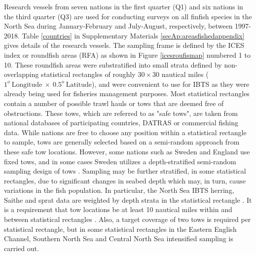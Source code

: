 \documentclass[a4paper 12pt]{article}
\numberwithin{equation}{section}
\begin{document}
Research vessels from seven nations in the first quarter (Q1) and six nations in the third quarter (Q3) are used for conducting surveys on all finfish species in the North Sea during January-February and July-August, respectively, between 1997-2018. Table \ref{countries} in Supplementary Materials \ref{secAp:areasfishedappendix} gives details of the research vessels. The sampling frame is defined by the ICES index or roundfish areas (RFA) as shown in Figure \ref{icesroufismap} numbered 1 to 10. These  roundfish areas were substratified into small strata defined by non-overlapping statistical rectangles of roughly $30 \times 30$ nautical miles ($1^{o} \  \mathrm{Longitude} \ \times  \  0.5^{o} \ \mathrm{Latitude}$), and were convenient to use for IBTS as they were already being used for fisheries management purposes. Most statistical rectangles contain a number of possible trawl hauls or tows that are deemed free of obstructions. These tows, which are referred to as   "safe tows", are taken from national databases of participating countries, DATRAS \citep{datras} or commercial fishing data. While nations are free to choose any position within a statistical rectangle to sample, tows are generally selected based on a semi-random approach from these safe tow locations. However, some nations such as Sweden and England use fixed tows, and in some cases Sweden utilizes a depth-stratified semi-random sampling design of tows \citep{ICES2018}. Sampling may be further stratified, in some statistical rectangles, due to significant changes in seabed depth which may, in turn, cause variations in the fish population. In particular, the North Sea IBTS herring, Saithe and sprat data are weighted by depth strata in the statistical rectangle \citep{ICES2013}. It is a requirement that tow locations be at least 10 nautical miles within and between statistical rectangles \citep{ICES2018}. Also, a target coverage of two tows is required per statistical rectangle\citep{ICES2015}, but in some statistical rectangles in the Eastern English Channel, Southern North Sea and Central North Sea intensified sampling is carried out.
\end{document}
